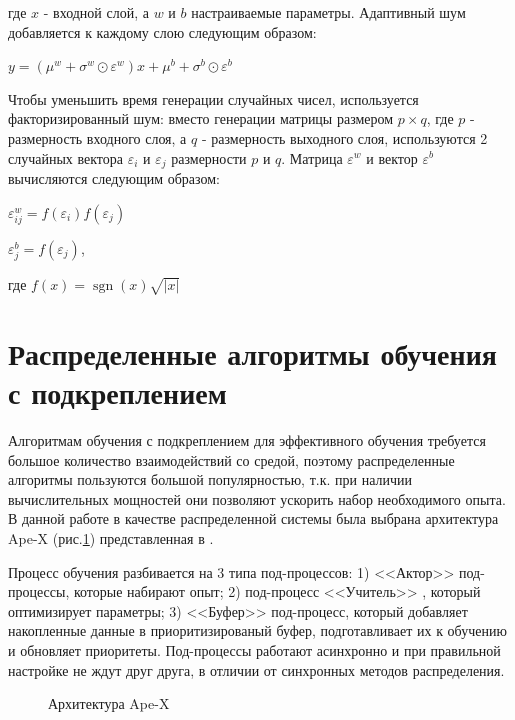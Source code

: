 \documentclass{mipt-thesis-bs}
\begin{document}
где $x$ - входной слой, а $w$ и $b$ настраиваемые параметры. Адаптивный шум добавляется к каждому слою следующим образом:

\begin{center}
    $y =(\mu^{w}+\sigma^{w} \odot \varepsilon^{w}) x+\mu^{b}+\sigma^{b} \odot \varepsilon^{b}$
\end{center}

Чтобы уменьшить время генерации случайных чисел, используется факторизированный шум: вместо генерации матрицы размером $p\times q$, где $p$ - размерность входного слоя, а $q$ - размерность выходного слоя, используются 2 случайных вектора $\varepsilon_i$ и $\varepsilon_j$ размерности $p$ и $q$. Матрица $\varepsilon^w$ и вектор $\varepsilon^b$ вычисляются следующим образом:

\begin{center}
$\varepsilon_{i j}^{w} =f(\varepsilon_{i}) f(\varepsilon_{j})$

$\varepsilon_{j}^{b} =f(\varepsilon_{j})$,

где $f(x)=\operatorname{sgn}(x) \sqrt{|x|}$
\end{center}

\section{Распределенные алгоритмы обучения с подкреплением}

Алгоритмам обучения с подкреплением для эффективного обучения требуется большое количество взаимодействий со средой, поэтому распределенные алгоритмы пользуются большой популярностью, т.к. при наличии вычислительных мощностей они позволяют ускорить набор необходимого опыта. В данной работе в качестве распределенной системы была выбрана архитектура Ape-X (рис.\ref{apex}) представленная в \cite{apex}.

Процесс обучения разбивается на 3 типа под-процессов: 1) <<Актор>> под-процессы, которые набирают опыт; 2) под-процесс <<Учитель>> , который оптимизирует параметры; 3) <<Буфер>> под-процесс, который добавляет накопленные данные в приоритизированый буфер, подготавливает их к обучению и обновляет приоритеты. Под-процессы работают асинхронно и при правильной настройке не ждут друг друга, в отличии от синхронных методов распределения. 

\begin{figure}[ht]
    \centering
    \vspace{-0.2cm}
    \caption{Архитектура Ape-X}
    \label{apex}
\end{figure}
\end{document}
